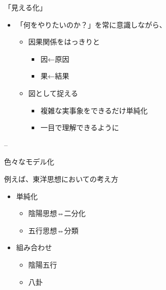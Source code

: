 \begin{frame}

\begin{block}{「見える化」}

\begin{itemize}
\tightlist
\item
  「何をやりたいのか？」を常に意識しながら、

  \begin{itemize}
  \tightlist
  \item
    因果関係をはっきりと

    \begin{itemize}
    \tightlist
    \item
      因←原因\\
    \item
      果←結果
    \end{itemize}
  \item
    図として捉える

    \begin{itemize}
    \tightlist
    \item
      複雑な実事象をできるだけ単純化
    \item
      一目で理解できるように
    \end{itemize}
  \end{itemize}
\end{itemize}

--

\end{block}

\begin{block}{色々なモデル化}

例えば、東洋思想においての考え方

\begin{itemize}
\tightlist
\item
  単純化

  \begin{itemize}
  \tightlist
  \item
    陰陽思想⇔二分化
  \item
    五行思想⇔分類
  \end{itemize}
\item
  組み合わせ

  \begin{itemize}
  \tightlist
  \item
    陰陽五行
  \item
    八卦
  \end{itemize}
\end{itemize}


\end{block}
\end{frame}
